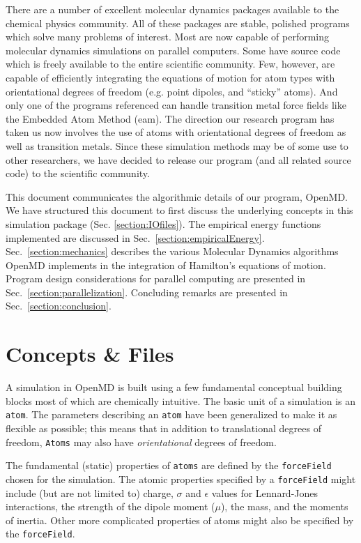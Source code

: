 \documentclass[]{book}
\begin{document}
There are a number of excellent molecular dynamics packages available
to the chemical physics
community.\cite{Brooks83,MacKerell98,pearlman:1995,Gromacs,Gromacs3,DL_POLY,Tinker,Paradyn,namd,macromodel}
All of these packages are stable, polished programs which solve many
problems of interest.  Most are now capable of performing molecular
dynamics simulations on parallel computers.  Some have source code
which is freely available to the entire scientific community.  Few,
however, are capable of efficiently integrating the equations of
motion for atom types with orientational degrees of freedom
(e.g. point dipoles, and ``sticky'' atoms).  And only one of the
programs referenced can handle transition metal force fields like the
Embedded Atom Method ({\sc eam}).  The direction our research program
has taken us now involves the use of atoms with orientational degrees
of freedom as well as transition metals.  Since these simulation
methods may be of some use to other researchers, we have decided to
release our program (and all related source code) to the scientific
community.

This document communicates the algorithmic details of our program,
{\sc OpenMD}.  We have structured this document to first discuss the
underlying concepts in this simulation package (Sec.
\ref{section:IOfiles}).  The empirical energy functions implemented
are discussed in Sec.~\ref{section:empiricalEnergy}.
Sec.~\ref{section:mechanics} describes the various Molecular Dynamics
algorithms {\sc OpenMD} implements in the integration of Hamilton's
equations of motion.  Program design considerations for parallel
computing are presented in Sec.~\ref{section:parallelization}.
Concluding remarks are presented in Sec.~\ref{section:conclusion}.

\chapter{\label{section:IOfiles}Concepts \& Files}

A simulation in {\sc OpenMD} is built using a few fundamental
conceptual building blocks most of which are chemically intuitive.
The basic unit of a simulation is an {\tt atom}.  The parameters
describing an {\tt atom} have been generalized to make it as flexible
as possible; this means that in addition to translational degrees of
freedom, {\tt Atoms} may also have {\it orientational} degrees of freedom.

The fundamental (static) properties of {\tt atoms} are defined by the
{\tt forceField} chosen for the simulation.  The atomic properties
specified by a {\tt forceField} might include (but are not limited to)
charge, $\sigma$ and $\epsilon$ values for Lennard-Jones interactions,
the strength of the dipole moment ($\mu$), the mass, and the moments
of inertia.  Other more complicated properties of atoms might also be
specified by the {\tt forceField}.
\end{document}
